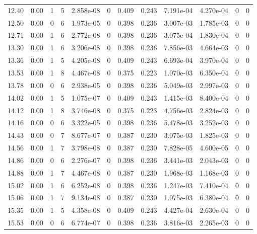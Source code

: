 \documentclass[preview]{standalone}
\begin{document}
{{{\begin{tabular}{L{1.2cm}C{1.2cm} C{0.3cm}C{0.5cm} C{1.4cm}C{1.4cm} C{1.4cm}C{1.4cm} C{1.6cm}C{1.6cm} C{1.6cm}C{1.6cm}}
  12.40  &  0.00  & 1     &  5 &  2.858e-08  & 0  &  0.409&   0.243& 7.191e-04 & 4.270e-04   &  0 & 0  \\ 
  12.50  &  0.00  & 0     &  6 &  1.973e-05  & 0  &  0.398&   0.236& 3.007e-03 & 1.785e-03   &  0 & 0  \\ 
  12.71  &  0.00  & 1     &  6 &  2.772e-08  & 0  &  0.398&   0.236& 3.075e-04 & 1.830e-04   &  0 & 0  \\ 
  13.30  &  0.00  & 1     &  6 &  3.206e-08  & 0  &  0.398&   0.236& 7.856e-03 & 4.664e-03   &  0 & 0  \\ 
  13.36  &  0.00  & 1     &  5 &  4.205e-08  & 0  &  0.409&   0.243& 6.693e-04 & 3.970e-04   &  0 & 0  \\ 
  13.53  &  0.00  & 1     &  8 &  4.467e-08  & 0  &  0.375&   0.223& 1.070e-03 & 6.350e-04   &  0 & 0  \\ 
  13.78  &  0.00  & 0     &  6 &  2.938e-05  & 0  &  0.398&   0.236& 5.049e-03 & 2.997e-03   &  0 & 0  \\ 
  14.02  &  0.00  & 1     &  5 &  1.075e-07  & 0  &  0.409&   0.243& 1.415e-03 & 8.400e-04   &  0 & 0  \\ 
  14.12  &  0.00  & 1     &  8 &  3.746e-08  & 0  &  0.375&   0.223& 4.756e-03 & 2.824e-03   &  0 & 0  \\ 
  14.16  &  0.00  & 0     &  6 &  3.322e-05  & 0  &  0.398&   0.236& 5.478e-03 & 3.252e-03   &  0 & 0  \\ 
  14.43  &  0.00  & 0     &  7 &  8.677e-07  & 0  &  0.387&   0.230& 3.075e-03 & 1.825e-03   &  0 & 0  \\ 
  14.56  &  0.00  & 1     &  7 &  3.798e-08  & 0  &  0.387&   0.230& 7.828e-05 & 4.600e-05   &  0 & 0  \\ 
  14.86  &  0.00  & 0     &  6 &  2.276e-07  & 0  &  0.398&   0.236& 3.441e-03 & 2.043e-03   &  0 & 0  \\ 
  14.88  &  0.00  & 1     &  7 &  4.467e-08  & 0  &  0.387&   0.230& 1.968e-03 & 1.168e-03   &  0 & 0  \\ 
  15.02  &  0.00  & 1     &  6 &  6.252e-08  & 0  &  0.398&   0.236& 1.247e-03 & 7.410e-04   &  0 & 0  \\ 
  15.06  &  0.00  & 1     &  7 &  9.134e-08  & 0  &  0.387&   0.230& 1.075e-03 & 6.380e-04   &  0 & 0  \\ 
  15.35  &  0.00  & 1     &  5 &  4.358e-08  & 0  &  0.409&   0.243& 4.427e-04 & 2.630e-04   &  0 & 0  \\ 
  15.53  &  0.00  & 0     &  6 &  6.774e-07  & 0  &  0.398&   0.236& 3.816e-03 & 2.265e-03   &  0 & 0  \\ 

\end{tabular}}}}
\end{document}

